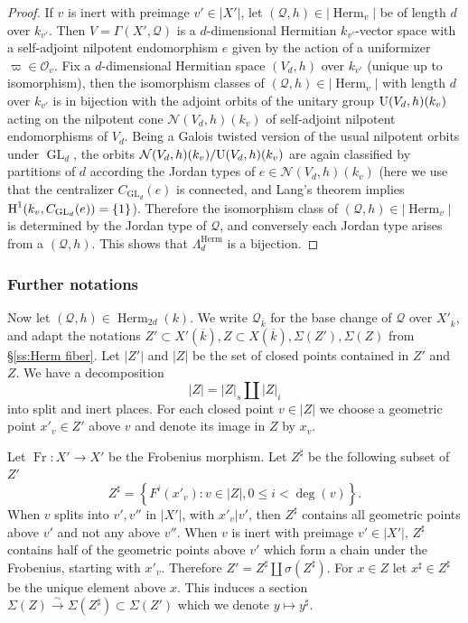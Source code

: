\documentclass[reqno]{amsart}
\numberwithin{equation}{section}
\DeclareMathOperator{\GL}{GL}
\DeclareMathOperator{\Frob}{Fr}
\DeclareMathOperator{\Herm}{Herm}
\newcommand{\SH}{\textup{SkHm}}
\newcommand{\Ug}{\textup{U}}
\newcommand\Sig{\Sigma}
\newcommand{\isom}{\stackrel{\sim}{\to}}
\newcommand{\ov}{\overline}
\newcommand{\cohog}[2]{\textup{H}^{#1}({#2})}     %
\newcommand{\s}{\sigma}
\newcommand{\vp}{\varpi}
\renewcommand{\L}{\Lambda}
\newcommand\sh{\sharp}
\newcommand\cN{\mathcal{N}}
\newcommand\cO{\mathcal{O}}
\newcommand\cQ{\mathcal{Q}}
\theoremstyle{remark}
\numberwithin{equation}{section}
\begin{document}
\begin{proof}
If $v$ is inert with preimage  $v'\in |X'|$, let $(\cQ,h)\in |\Herm_{v}|$ be of length $d$ over $k_{v'}$. Then $V=\Gamma(X',\cQ)$ is a $d$-dimensional Hermitian $k_{v'}$-vector space with a self-adjoint nilpotent endomorphism $e$ given by the action of a uniformizer $\vp\in \cO_{v}$. Fix a $d$-dimensional Hermitian space $(V_{d},h)$ over $k_{v'}$ (unique up to isomorphism), then the isomorphism classes of $(\cQ,h)\in |\Herm_{v}|$ with length $d$ over $k_{v'}$ is in bijection with the adjoint orbits of the unitary group $\Ug(V_{d},h)(k_v)$ acting on the nilpotent cone $\cN(V_{d},h)(k_v)$ of self-adjoint nilpotent endomorphisms of $V_{d}$. Being a Galois twisted version of the usual nilpotent orbits under $\GL_{d}$, the orbits $\cN(V_{d},h)(k_v)/\Ug(V_{d},h)(k_v)$ are again classified by partitions of $d$ according the Jordan types of $e\in \cN(V_{d},h)(k_v)$ (here we use that the centralizer $C_{\GL_{d}}(e)$ is connected, and Lang's theorem implies $\cohog{1}{k_v, C_{\GL_{d}}(e)}=\{1\}$). Therefore the isomorphism class of $(\cQ,h)\in |\Herm_{v}|$ is determined by the Jordan type of $\cQ$, and conversely each Jordan type arises from a $(\cQ, h)$. This shows that $\L^{\Herm}_{d}$ is a bijection.  
\end{proof}



\subsubsection{Further notations}\label{sss:choose points}
Now let $(\cQ,h)\in \Herm_{2d}(k)$. We write $\cQ_{\ov k}$ for the base change of $\cQ$ over $X'_{\ov k}$, and adapt the notations $Z'\subset X'(\ov k),Z\subset X(\ov k),\Sig(Z'),\Sig(Z)$ from \S\ref{ss:Herm fiber}. Let $|Z'|$ and $|Z|$ be the set of closed points contained in $Z'$ and $Z$. We have a decomposition
\begin{equation*}
|Z|=|Z|_{s}\coprod |Z|_{i}
\end{equation*}
into split and inert places. For each closed point $v\in |Z|$ we choose a geometric point $x'_{v}\in Z'$ above $v$ and denote its image in $Z$ by $x_{v}$.

Let $\Frob:X'\to X'$ be the Frobenius morphism.  Let $Z^{\sh}$ be the following subset of $Z'$
\begin{equation*}
Z^{\sh}=\left\{F^{i}(x'_{v}): v\in |Z|, 0\le i<\deg(v)\right\}.
\end{equation*}
When $v$ splits into $v',v''$ in $|X'|$, with $x'_{v}|v'$, then $Z^{\sh}$ contains all geometric points above $v'$ and not any above $v''$. When $v$ is inert with preimage $v'\in|X'|$,  $Z^{\sh}$ contains half of the geometric points above $v'$ which form a chain under the Frobenius, starting with $x'_{v}$. Therefore $Z'=Z^{\sh}\coprod\s(Z^{\sh})$. For $x\in Z$ let $x^{\sh}\in Z^{\sh}$ be the unique element above $x$. This induces a section $\Sig(Z)\isom \Sig(Z^{\sh})\subset \Sig(Z')$ which we denote $y\mapsto y^{\sh}$.
\end{document}
